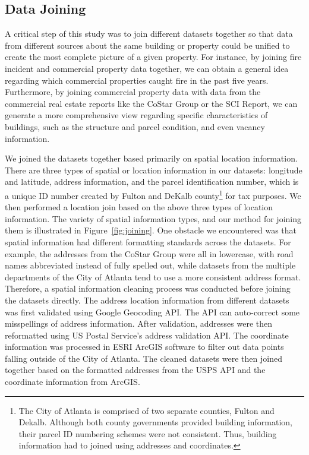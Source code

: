 \documentclass{sig-alternate-05-2015}
\begin{document}
{\subsection{Data Joining}
A critical step of this study was to join different datasets together so that data from different sources about the same building or property could be unified to create the most complete picture of a given property. For instance, by joining fire incident and commercial property data together, we can obtain a general idea regarding which commercial properties caught fire in the past five years. Furthermore, by joining commercial property data with data from the commercial real estate reports like the CoStar Group or the SCI Report, we can generate a more comprehensive view regarding specific characteristics of buildings, such as the structure and parcel condition, and even vacancy information.  

We joined the datasets together based primarily on spatial location information. There are three types of spatial or location information in our datasets: longitude and latitude, address information, and the parcel identification number, which is a unique ID number created by Fulton and DeKalb county\footnote{The City of Atlanta is comprised of two separate counties, Fulton and Dekalb. 
Although both county governments provided building information,  their parcel ID numbering schemes were not consistent.
Thus, building information had to joined using addresses and coordinates.} for tax purposes. We then performed a location join based on the above three types of location information. The variety of spatial information types, and our method for joining them is illustrated in Figure~\ref{fig:joining}. One obstacle we encountered was that spatial information had different formatting standards across the datasets. For example, the addresses from the CoStar Group were all in lowercase, with road names abbreviated instead of fully spelled out, while datasets from the multiple departments of the City of Atlanta tend to use a more consistent address format. Therefore, a spatial information cleaning process was conducted before joining the datasets directly. The address location information from different datasets was first validated using Google Geocoding API. The API can auto-correct some misspellings of address information. After validation, addresses were then reformatted using US Postal Service's address validation API. The coordinate information was processed in ESRI ArcGIS software to filter out data points falling outside of the City of Atlanta. The cleaned datasets were then joined together based on the formatted addresses from the USPS API and the coordinate information from ArcGIS.



}
\end{document}
